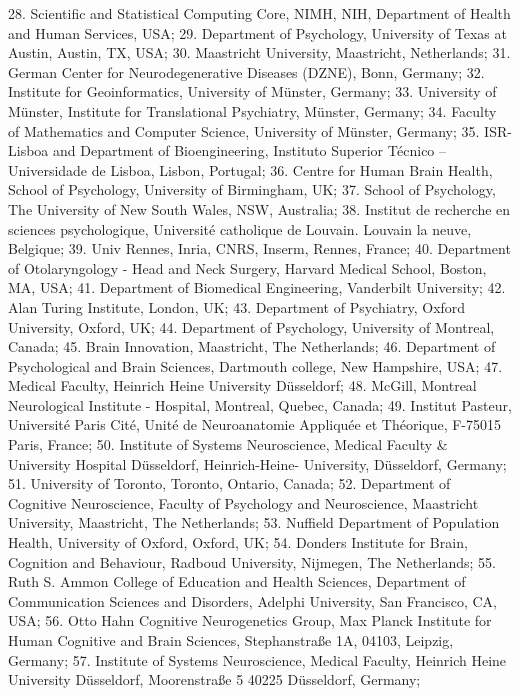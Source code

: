 \documentclass[10pt,a4paper,twocolumns]{proc}
\begin{document}
{28. Scientific and Statistical Computing Core, NIMH, NIH, Department of Health and Human Services, USA; %
29. Department of Psychology, University of Texas at Austin, Austin, TX, USA; %
30. Maastricht University, Maastricht, Netherlands; %
31. German Center for Neurodegenerative Diseases (DZNE), Bonn, Germany; %
32. Institute for Geoinformatics, University of Münster, Germany; %
33. University of Münster, Institute for Translational Psychiatry, Münster, Germany; %
34. Faculty of Mathematics and Computer Science, University of Münster, Germany; %
35. ISR-Lisboa and Department of Bioengineering, Instituto Superior Técnico – Universidade de Lisboa, Lisbon, Portugal; %
36. Centre for Human Brain Health, School of Psychology, University of Birmingham, UK; %
37. School of Psychology, The University of New South Wales, NSW, Australia; %
38. Institut de recherche en sciences psychologique, Université catholique de Louvain. Louvain la neuve, Belgique; %
39. Univ Rennes, Inria, CNRS, Inserm, Rennes, France; %
40. Department of Otolaryngology - Head and Neck Surgery, Harvard Medical School, Boston, MA, USA; %
41. Department of Biomedical Engineering, Vanderbilt University; %
42. Alan Turing Institute, London, UK; %
43. Department of Psychiatry, Oxford University, Oxford, UK; %
44. Department of Psychology, University of Montreal, Canada; %
45. Brain Innovation, Maastricht, The Netherlands; %
46. Department of Psychological and Brain Sciences, Dartmouth college, New Hampshire, USA; %
47. Medical Faculty, Heinrich Heine University Düsseldorf; %
48. McGill, Montreal Neurological Institute - Hospital, Montreal, Quebec, Canada; %
49. Institut Pasteur, Université Paris Cité, Unité de Neuroanatomie Appliquée et Théorique, F-75015 Paris, France; %
50. Institute of Systems Neuroscience, Medical Faculty & University Hospital Düsseldorf, Heinrich-Heine- University, Düsseldorf, Germany; %
51. University of Toronto, Toronto, Ontario, Canada; %
52. Department of Cognitive Neuroscience, Faculty of Psychology and Neuroscience, Maastricht University, Maastricht, The Netherlands; %
53. Nuffield Department of Population Health, University of Oxford, Oxford, UK; %
54. Donders Institute for Brain, Cognition and Behaviour, Radboud University, Nijmegen, The Netherlands; %
55. Ruth S. Ammon College of Education and Health Sciences, Department of Communication Sciences and Disorders, Adelphi University, San Francisco, CA, USA; %
56. Otto Hahn Cognitive Neurogenetics Group, Max Planck Institute for Human Cognitive and Brain Sciences, Stephanstraße 1A, 04103, Leipzig, Germany; %
57. Institute of Systems Neuroscience, Medical Faculty, Heinrich Heine University Düsseldorf, Moorenstraße 5 40225 Düsseldorf, Germany; %
}
\end{document}

